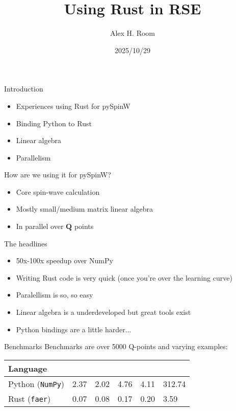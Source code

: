 \documentclass{beamer}
\title{Using Rust in RSE}
\author{Alex H. Room}
\date{2025/10/29}
\begin{document}
\begin{frame}
\titlepage
\end{frame}

\begin{frame}{Introduction}
  \begin{itemize}
    \item Experiences using Rust for pySpinW
    \item Binding Python to Rust
    \item Linear algebra
    \item Parallelism
  \end{itemize}
\end{frame}

\begin{frame}{How are we using it for pySpinW?}
  \begin{itemize}
    \item Core spin-wave calculation
    \item Mostly small/medium matrix linear algebra
    \item In parallel over $\mathbf{Q}$ points
  \end{itemize}
\end{frame}

\begin{frame}{The headlines}
  \begin{itemize}
    \item 50x-100x speedup over NumPy
    \item Writing Rust code is very quick (once you're over the learning curve)
    \item Paralellism is so, so easy
    \item Linear algebra is a underdeveloped but great tools exist
    \item Python bindings are a little harder...
  \end{itemize}
\end{frame}

\begin{frame}{Benchmarks}
Benchmarks are over 5000 Q-points and varying examples:

\begin{tabular}{l l l l l l}
  Language & & & & & \\
  \hline\hline
  Python (\texttt{NumPy}) & 2.37 & 2.02 & 4.76 & 4.11 & 312.74 \\
  Rust (\texttt{faer}) & 0.07 & 0.08 & 0.17 & 0.20 & 3.59 \\
\end{tabular}
\end{frame}
\end{document}
